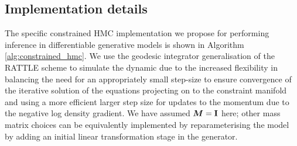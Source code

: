 
\subsection{Implementation details}

The specific constrained \ac{HMC} implementation we propose for performing inference in differentiable generative models is shown in Algorithm \ref{alg:constrained_hmc}. We use the geodesic integrator generalisation of the RATTLE scheme to simulate the dynamic due to the increased flexibility in balancing the need for an appropriately small step-size to ensure convergence of the iterative solution of the equations projecting on to the constraint manifold and using a more efficient larger step size for updates to the momentum due to the negative log density gradient. We have assumed $\boldsymbol{M} = \mathbf{I}$ here; other mass matrix choices can be equivalently implemented by reparameterising the model by adding an initial linear transformation stage in the generator.

